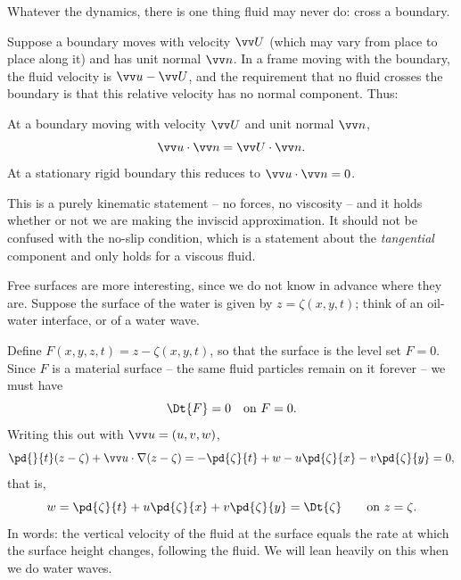 Whatever the dynamics, there is one thing fluid may never do: cross a boundary.

Suppose a boundary moves with velocity $\vv U$ (which may vary from place to place along it) and has unit normal $\vv n$. In a frame moving with the boundary, the fluid velocity is $\vv u - \vv U$, and the requirement that no fluid crosses the boundary is that this relative velocity has no normal component. Thus:

\begin{definition}
	At a boundary moving with velocity $\vv U$ and unit normal $\vv n$,
	$$
	\vv u \cdot \vv n = \vv U \cdot \vv n.
	$$
	At a stationary rigid boundary this reduces to $\vv u \cdot \vv n = 0$.
\end{definition}

This is a purely kinematic statement -- no forces, no viscosity -- and it holds whether or not we are making the inviscid approximation. It should not be confused with the no-slip condition, which is a statement about the \emph{tangential} component and only holds for a viscous fluid.

Free surfaces are more interesting, since we do not know in advance where they are. Suppose the surface of the water is given by $z = \zeta(x, y, t)$; think of an oil-water interface, or of a water wave.

\begin{center}
\end{center}

Define $F(x, y, z, t) = z - \zeta(x, y, t)$, so that the surface is the level set $F = 0$. Since $F$ is a material surface -- the same fluid particles remain on it forever -- we must have
$$
\Dt{F} = 0 \quad \text{on } F = 0.
$$
Writing this out with $\vv u = (u, v, w)$,
$$
\pd{}{t}(z - \zeta) + \vv u \cdot \nabla (z - \zeta) = -\pd{\zeta}{t} + w - u \pd{\zeta}{x} - v\pd{\zeta}{y} = 0,
$$
that is,
$$
w = \pd{\zeta}{t} + u \pd{\zeta}{x} + v \pd{\zeta}{y} = \Dt{\zeta} \qquad \text{on } z = \zeta.
$$
In words: the vertical velocity of the fluid at the surface equals the rate at which the surface height changes, following the fluid. We will lean heavily on this when we do water waves.

